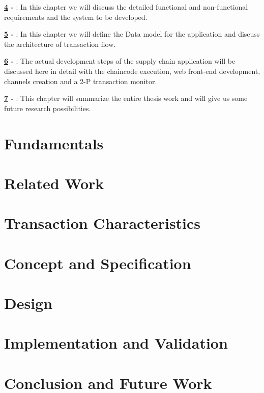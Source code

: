 \documentclass[
  a4paper,  %
  twoside,  %
  bibliography=totoc,
  headsepline,
  cleardoublepage=empty,
  parskip=half,
  draft=false
]{scrbook}
\begin{document}
\textbf{\cref{chap:cs} - } : In this chapter we will discuss the detailed functional and non-functional requirements and the system to be developed.

\textbf{\cref{chap:de} - } : In this chapter we will define the Data model for the application and discuss the architecture of transaction flow.

\textbf{\cref{chap:iv} - } : The actual development steps of the supply chain application will be discussed here in detail with the chaincode execution, web front-end development, channels creation and a 2-P transaction monitor.

\textbf{\cref{chap:cf} - } : This chapter will summarize the entire thesis work and will give us some future research possibilities.


\chapter{Fundamentals}
\label{chap:fund}


\chapter{Related Work}
\label{chap:rel}


\chapter{Transaction Characteristics}
\label{chap:tc}


\chapter{Concept and Specification}
\label{chap:cs}


\chapter{Design}
\label{chap:de}


\chapter{Implementation and Validation}
\label{chap:iv}


\chapter{Conclusion and Future Work}
\label{chap:cf}


\printbibliography

\appendix
%

\pagestyle{empty}
\renewcommand*{\chapterpagestyle}{empty}
\Versicherung
\end{document}
